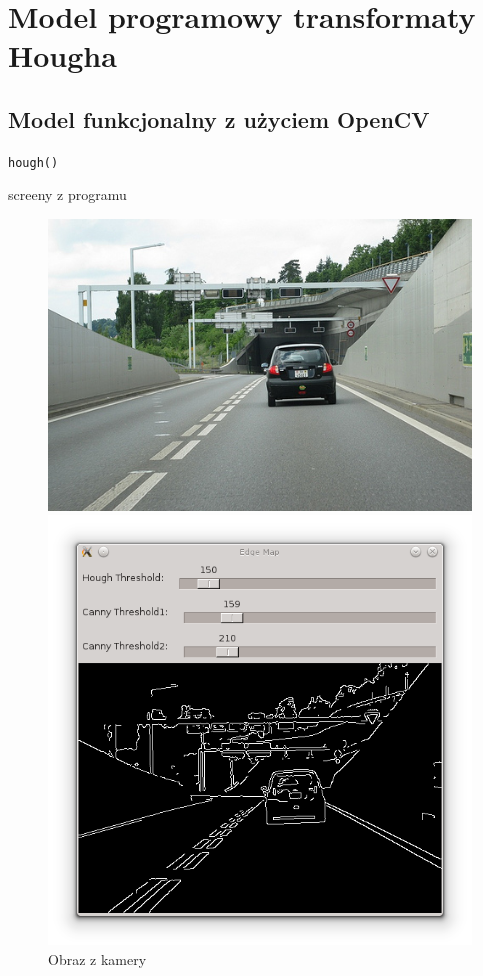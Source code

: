 \section{Model programowy transformaty Hougha}

\blindtext

\subsection{Model funkcjonalny z użyciem OpenCV}

\texttt{hough()}

screeny z programu

\begin{figure}[!htb]
  \includegraphics[width=\linewidth]{img/road4.jpg}
  \caption{Obraz z kamery}\label{fig:awesome_image1}
\endminipage\hfill
{}
  \includegraphics[width=\linewidth]{img/canny_screen.png}

\end{figure}
